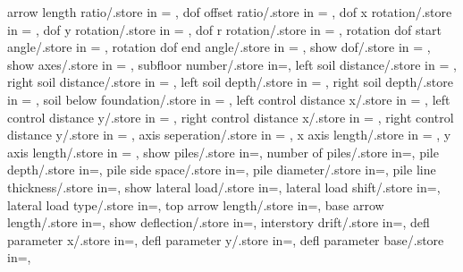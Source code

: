 {  arrow length ratio/.store in = \arrowlenratio,
  dof offset ratio/.store in = \dofoffsetratio,
  dof x rotation/.store in = \dofxrotation,
  dof y rotation/.store in = \dofyrotation,
  dof r rotation/.store in = \dofrrotation,
  rotation dof start angle/.store in = \rotdofstartangle,
  rotation dof end angle/.store in = \rotdofendangle,
  show dof/.store in = \showdof,
  show axes/.store in = \showaxes,
  subfloor number/.store in=\subfloors,
  left soil distance/.store in = \leftsoildist,
  right soil distance/.store in = \rightsoildist,
  left soil depth/.store in = \leftsoildepth,
  right soil depth/.store in = \rightsoildepth,
  soil below foundation/.store in = \soilbelowfound,
  left control distance x/.store in = \leftcontrolx,
  left control distance y/.store in = \leftcontroly,
  right control distance x/.store in = \rightcontrolx,
  right control distance y/.store in = \rightcontroly,
  axis seperation/.store in = \axisseperation,
  x axis length/.store in = \axeslenX,
  y axis length/.store in = \axeslenY,
  show piles/.store in=\showpiles,
  number of piles/.store in=\numberofpiles,
  pile depth/.store in=\piledepth,
  pile side space/.store in=\pilesidespace,
  pile diameter/.store in=\pilediameter,
  pile line thickness/.store in=\pilelinethickness,
  show lateral load/.store in=\showlatload,
  lateral load shift/.store in=\latloadshift,
  lateral load type/.store in=\latloadtype,
  top arrow length/.store in=\toparrlen,
  base arrow length/.store in=\basearrlen,
  show deflection/.store in=\showdefl, 
  interstory drift/.store in=\drift,
  defl parameter x/.store in=,
  defl parameter y/.store in=,
  defl parameter base/.store in=,}

